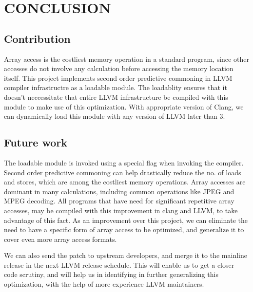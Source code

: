 
\chapter{CONCLUSION} %
\section{Contribution}

Array access is the costliest memory operation in a standard program, since other accesses do not involve any calculation before accessing the memory location itself. This project implements second order predictive commoning in LLVM compiler infrastructre as a loadable module. The loadablity ensures that it doesn't neccessitate that entire LLVM infrastructure be compiled with this module to make use of this optimization. With appropriate version of Clang, we can dynamically load this module with any version of LLVM later than 3.
\section{Future work}
The loadable module is invoked using a special flag when invoking the compiler. Second order predictive commoning can help drastically reduce the no. of loads and stores, which are among the costliest memory operations. Array accesses are dominant in many calculations, including common operations like JPEG and MPEG decoding. All programs that have need for significant repetitive array accesses, may be compiled with this improvement in clang and LLVM, to take advantage of this fact. As an improvement over this project, we can eliminate the need to have a specific form of array access to be optimized, and generalize it to cover even more array access formats. 

We can also send the patch to upstream developers, and merge it to the mainline release in the next LLVM release schedule. This will enable us to get a closer code scrutiny, and will help us in identifying in further generalizing this optimization, with the help of more experience LLVM maintainers. 